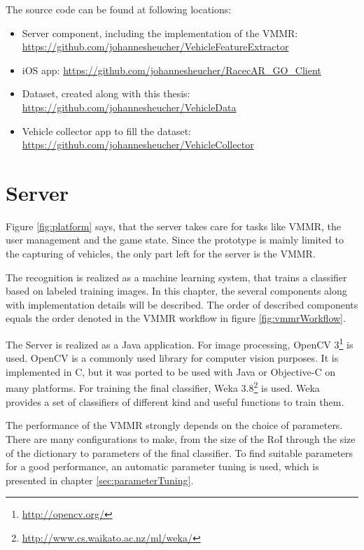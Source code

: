 The source code can be found at following locations:
\begin{itemize}
  \item Server component, including the implementation of the VMMR: \url{https://github.com/johannesheucher/VehicleFeatureExtractor}
  \item iOS app: \url{https://github.com/johannesheucher/RacecAR_GO_Client}
  \item Dataset, created along with this thesis: \url{https://github.com/johannesheucher/VehicleData}
  \item Vehicle collector app to fill the dataset: \url{https://github.com/johannesheucher/VehicleCollector}
\end{itemize}


\section{Server}
Figure \ref{fig:platform} says, that the server takes care for tasks like VMMR, the user management and the game state. Since the prototype is mainly limited to the capturing of vehicles, the only part left for the server is the VMMR.

The recognition is realized as a machine learning system, that trains a classifier based on labeled training images. In this chapter, the several components along with implementation details will be described. The order of described components equals the order denoted in the VMMR workflow in figure \ref{fig:vmmrWorkflow}.

The Server is realized as a Java application. For image processing, OpenCV 3\footnote{\url{http://opencv.org/}} is used. OpenCV is a commonly used library for computer vision purposes. It is implemented in C, but it was ported to be used with Java or Objective-C on many platforms. For training the final classifier, Weka 3.8\footnote{\url{http://www.cs.waikato.ac.nz/ml/weka/}} is used. Weka provides a set of classifiers of different kind and useful functions to train them.

The performance of the VMMR strongly depends on the choice of parameters. There are many configurations to make, from the size of the RoI through the size of the dictionary to parameters of the final classifier. To find suitable parameters for a good performance, an automatic parameter tuning is used, which is presented in chapter \ref{sec:parameterTuning}.

